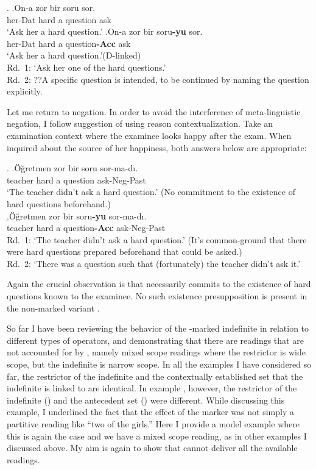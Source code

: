 \documentclass[11pt,a4paper]{article}
\begin{document}
\ex.
\ag.\label{impz}{On-a} {zor} {bir} {soru} {sor}.\\
{her-Dat} {hard} {a} {question} {ask}\\
`Ask her a hard question.'
\bg.\label{impa}{On-a} {zor} {bir} {soru\bf{-yu}} {sor}.\\
{her-Dat} {hard} {a} {question\bf{-Acc}} {ask}\\
`Ask her a hard question.'\hfill (D-linked)\\
Rd.\ 1: `Ask her one of the hard questions.'\\
Rd.\ 2: ??A specific question is intended, to be continued by naming the question
explicitly.


Let me return to negation. In order to avoid the interference of meta-linguistic negation, I follow  suggestion of using reason contextualization. Take an examination context where the examinee looks happy after the exam. When inquired about the source of her happiness, both answers below are appropriate:  

\ex.
\a.\label{sorunegz}Öğretmen zor bir soru sor-ma-dı.\\
teacher hard a question ask-Neg-Past\\
`The teacher didn't ask a hard question.' (No commitment to the
existence of hard questions beforehand.)\\
\b.\label{sorunega}Öğretmen zor bir soru{\bf-yu} sor-ma-dı.\\
teacher hard a question{\bf-Acc} ask-Neg-Past\\
Rd.\ 1: `The teacher didn't ask a hard question.' (It's
common-ground that there were hard questions prepared beforehand that could be asked.)\\
Rd.\ 2: `There was a question such that (fortunately) the teacher didn't ask
it.'

Again the crucial observation is that  necessarily commits to the existence of hard questions known to the examinee. No such existence presupposition is present in the non-marked variant .

So far I have been reviewing the behavior of the \acc-marked indefinite in relation to different types of operators, and demonstrating that there are readings that are not accounted for by , namely mixed scope readings where the restrictor is wide scope, but the indefinite is narrow scope. In all the examples I have considered so far, the restrictor of the indefinite and the contextually established set that the indefinite is linked to are identical. In  example , however, the restrictor of the indefinite () and the antecedent set () were different. While discussing this example, I underlined the fact that the effect of the marker was not simply a partitive reading like ``two of the girls.'' Here I provide a model example where this is again the case and we have a mixed scope reading, as in other examples I discussed above. My aim is again to show that  cannot deliver all the available readings. 
 
\end{document}
